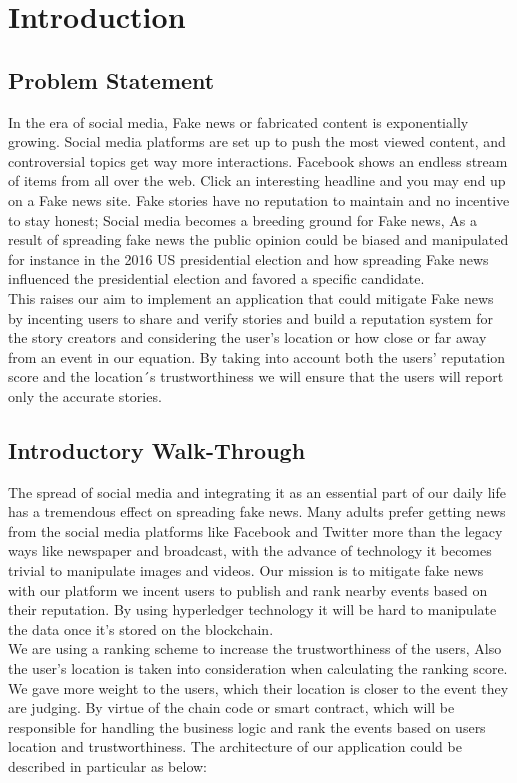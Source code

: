 
\chapter{Introduction}

\section{Problem Statement}

In the era of social media, Fake news or fabricated content is exponentially growing. Social media platforms are set up to push the most viewed content, and controversial topics get way more interactions.
Facebook shows an endless stream of items from all over the web. 
Click an interesting headline and you may end up on a Fake news site. 
Fake stories have no reputation to maintain and no incentive to stay honest; Social media becomes a breeding ground for Fake news, As a result of spreading fake news the public opinion could be biased and manipulated for instance in the 2016 US presidential election and how spreading Fake news influenced the presidential election and favored a specific candidate. \\
This raises our aim to implement an application that could mitigate Fake news by incenting users to share and verify stories and build a reputation system for the story creators and considering the user's location or how close or far away from an event in our equation.
By taking into account both the users' reputation score and the location´s trustworthiness we will ensure that the users will report only the accurate stories. 

	\section{Introductory Walk-Through}
The spread of social media and integrating it as an essential part of our daily life has a tremendous effect on spreading fake news. Many adults prefer getting news from the social media platforms like Facebook and Twitter more than the legacy ways like newspaper and broadcast, with the advance of technology it becomes trivial to manipulate images and videos.   
    Our mission is to mitigate fake news with our platform we incent users to publish and rank nearby events based on their reputation. By using hyperledger technology it will be hard to manipulate the data once it's stored on the blockchain.\\ 

We are using a ranking scheme to increase the trustworthiness of the users, Also the user's location is taken into consideration when calculating the ranking score. We gave more weight to the users, which their location is closer to the event they are judging. 
By virtue of the chain code or smart contract, which will be responsible for handling the business logic and rank the events based on users location and trustworthiness. The architecture of our application could be described in particular as below:      


